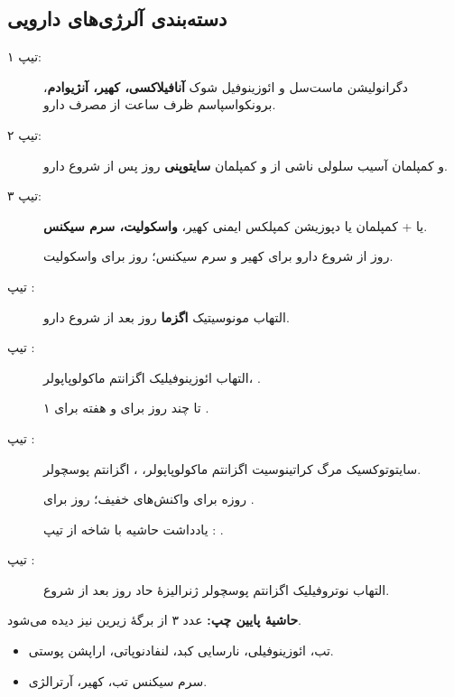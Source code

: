 \documentclass[12pt,a4paper]{article}
\begin{document}
\subsection*{دسته‌بندی آلرژی‌های دارویی}
\begin{description}
  \item[تیپ ۱:]  \ADRarrow{} دگرانولیشن ماست‌سل و ائوزینوفیل
  \ADRarrow{} شوک \textbf{آنافیلاکسی، کهیر، آنژیوادم}، برونکواسپاسم
  \ADRarrow{} ظرف  ساعت از مصرف دارو.

  \item[تیپ ۲:]  و کمپلمان \ADRarrow{} آسیب سلولی ناشی از
   و کمپلمان \ADRarrow{} \textbf{سایتوپنی}
  \ADRarrow{}  روز پس از شروع دارو.

  \item[تیپ ۳:]  یا  + کمپلمان یا 
  \ADRarrow{} دپوزیشن کمپلکس ایمنی \ADRarrow{} کهیر،
  \textbf{واسکولیت، سرم سیکنس}.
  \par {} روز از شروع دارو برای کهیر و سرم سیکنس؛
   روز برای واسکولیت.

  \item[تیپ :] 
  \ADRarrow{} التهاب مونوسیتیک \ADRarrow{} \textbf{اگزما}
  \ADRarrow{}  روز بعد از شروع دارو.

  \item[تیپ :] 
  \ADRarrow{} التهاب ائوزینوفیلیک \ADRarrow{}
  اگزانتم ماکولوپاپولر، \textbf{}.
  \par ۱ تا چند روز برای  و  هفته برای .

  \item[تیپ :]  سایتوتوکسیک \ADRarrow{} مرگ کراتینوسیت
  \ADRarrow{} اگزانتم ماکولوپاپولر، \textbf{}، اگزانتم پوسچولر.
  \par {} روزه برای واکنش‌های خفیف؛
   روز برای .
  \par یادداشت حاشیه با شاخه از تیپ : .

  \item[تیپ :] 
  \ADRarrow{} التهاب نوتروفیلیک \ADRarrow{} اگزانتم پوسچولر ژنرالیزهٔ حاد
  \ADRarrow{}  روز بعد از شروع.
\end{description}
\textbf{حاشیهٔ پایین چپ:} عدد ۳ از برگهٔ زیرین نیز دیده می‌شود.

\begin{itemize}
  \item {} \ADRarrow{} تب، ائوزینوفیلی، نارسایی کبد، لنفادنوپاتی، اراپشن پوستی.
  \item سرم سیکنس \ADRarrow{} تب، کهیر، آرترالژی.
\end{itemize}
\end{document}
